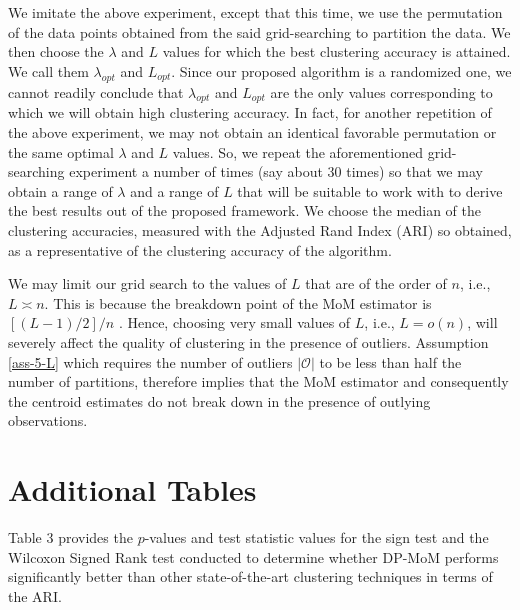 \documentclass{article}
\begin{document}
We imitate the above experiment, except that this time, we use the permutation of the data points obtained from the said grid-searching to partition the data. We then choose the $\lambda$ and $L$ values for which the best clustering accuracy is attained. We call them $\lambda_{opt}$ and $L_{opt}$. Since our proposed algorithm is a randomized one, we cannot readily conclude that $\lambda_{opt}$ and $L_{opt}$ are the only values corresponding to which we will obtain high clustering accuracy. In fact, for another repetition of the above experiment, we may not obtain an identical favorable permutation or the same optimal $\lambda$ and $L$ values. So, we repeat the aforementioned grid-searching experiment a number of times (say about 30 times) so that we may obtain a range of $\lambda$ and a range of $L$ that will be suitable to work with to derive the best results out of the proposed framework. We choose the median of the clustering accuracies, measured with the Adjusted Rand Index (ARI) \citep{Hubert1985} so obtained, as a representative of the clustering accuracy of the algorithm.

We may limit our grid search to the values of $L$ that are of the order of $n$, i.e., $L\asymp n$. This is because the breakdown point of the MoM estimator is $\left[(L-1)/2\right]/n$ \citep{rodriguez2019breakdown}. Hence, choosing very small values of $L$, i.e., $L=o(n)$, will severely affect the quality of clustering in the presence of outliers. Assumption \ref{ass-5-L} which requires the number of outliers $|\mathcal{O}|$ to be less than half the number of partitions, therefore implies that the MoM estimator and consequently the centroid estimates do not break down in the presence of outlying observations. 


\section{Additional Tables}

Table 3 provides the $p$-values and test statistic values for the sign test and the Wilcoxon Signed Rank test conducted to determine whether DP-MoM performs significantly better than other state-of-the-art clustering techniques in terms of the ARI.
\end{document}
